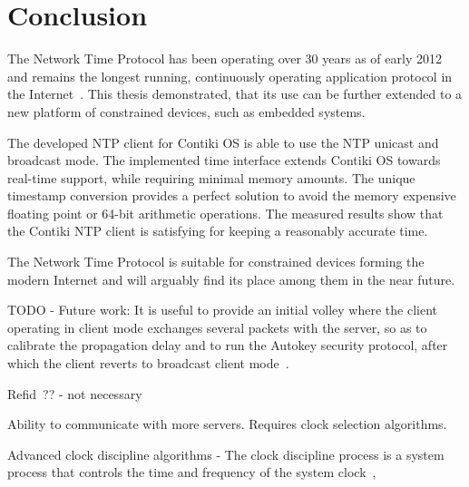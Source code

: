 



\chapter{Conclusion}
The Network Time Protocol has been operating over 30 years as of early 2012
and remains the longest running, continuously operating application
protocol in the Internet~\cite{ntp-y2k}.
This thesis demonstrated, that its use can be further extended to a new platform of constrained devices,
such as embedded systems.

The developed NTP client for Contiki OS is able to use the NTP unicast and broadcast mode.
The implemented time interface extends Contiki OS towards real-time support,
while requiring minimal memory amounts.
The unique timestamp conversion provides a perfect solution to avoid the
memory expensive floating point or 64-bit arithmetic operations.
The measured results show that the Contiki NTP client is satisfying for keeping a reasonably accurate time.

The Network Time Protocol is suitable for constrained devices
forming the modern Internet and will arguably find its place among them in the near future.





TODO - Future work:
It is useful to provide an initial volley where the client operating in
client mode exchanges several packets with the server, so as to
calibrate the propagation delay and to run the Autokey security
protocol, after which the client reverts to broadcast client mode~\cite{rfc5905}.

Refid~\cite{rfc5905}?? - not necessary

Ability to communicate with more servers. Requires clock selection algorithms.

Advanced clock discipline algorithms -
The clock discipline process is a system process that controls the
time and frequency of the system clock~\cite{rfc5905},




